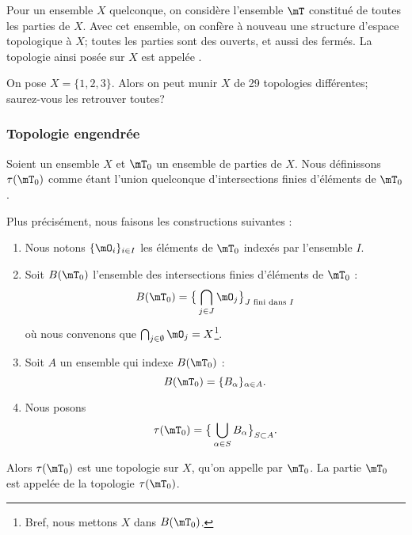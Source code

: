 \begin{example}\label{DefTopologieDiscrete}
  Pour un ensemble \( X \) quelconque, on considère l'ensemble \( \mT \) constitué de toutes les parties de \( X \). Avec cet ensemble, on confère à nouveau une structure d'espace topologique à \(X \); toutes les parties sont des ouverts, et aussi des fermés. La topologie ainsi posée sur \(X \) est appelée .
\end{example}

\begin{example}       \label{EXooLAOSooJtjJnu}
    On pose \( X = \{1, 2, 3\} \). Alors on peut munir \( X \) de 29 topologies différentes\cite{BIBooSLBZooRYtdIi}; saurez-vous les retrouver toutes?
\end{example}

\subsubsection{Topologie engendrée}

\begin{propositionDef}\label{DefTopologieEngendree}
    Soient un ensemble \( X \) et \( \mT_0 \) un ensemble de parties de \( X \). Nous définissons \( \tau(\mT_0)\) comme étant l'union quelconque d'intersections finies d'éléments de \( \mT_0 \). 

    Plus précisément, nous faisons les constructions suivantes :
    \begin{enumerate}
        \item
            Nous notons \( \{\mO_i \}_{i\in I}\) les éléments de \( \mT_0\) indexés par l'ensemble \( I\).
        \item 
            Soit  \( B(\mT_0)\) l'ensemble des intersections finies d'éléments de \( \mT_0\) :
            \begin{equation}
                B(\mT_0)=\big\{ \bigcap_{j\in J}\mO_j \big\}_{J\text{ fini dans }I}
            \end{equation}
            où nous convenons que \( \bigcap_{j\in\emptyset}\mO_j=X\)\footnote{Bref, nous mettons \( X\) dans \( B(\mT_0)\).}.
        \item
            Soit \( A\) un ensemble qui indexe \(   B(\mT_0) \) :
            \begin{equation}
                B(\mT_0)=\{ B_{\alpha} \}_{\alpha\in A}.
            \end{equation}
        \item 
            Nous posons
            \begin{equation}
                \tau(\mT_0)=\big\{    \bigcup_{\alpha\in S}B_{\alpha}   \big\}_{S\subset A}.
            \end{equation}
    \end{enumerate}
    Alors \( \tau(\mT_0) \) est une topologie sur \(X\), qu'on appelle  par \( \mT_0 \). La partie \( \mT_0\) est appelée  de la topologie \(  \tau(\mT_0)  \).
\end{propositionDef}

